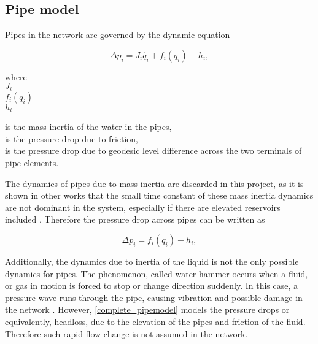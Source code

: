 \subsection{Pipe model}
\label{pipe_component}

Pipes in the network are governed by the dynamic equation

\begin{equation}
\label{complete_pipemodel}
  \Delta p_i = J_i \dot{q_i} + f_i(q_i) - h_i,
\end{equation}

 \begin{minipage}[t]{0.20\textwidth}
where\\
\hspace*{8mm} $J_i$ \\
\hspace*{8mm} $f_i(q_i)$ \\
\hspace*{8mm} $ h_i$ 
\end{minipage}
\begin{minipage}[t]{0.68\textwidth}
\vspace*{2mm}
is the mass inertia of the water in the pipes,\\ 
is the pressure drop due to friction,\\
is the pressure drop due to geodesic level difference across the two terminals of pipe elements.
\end{minipage}

The dynamics of pipes due to mass inertia are discarded in this project, as it is shown in other works that the small time constant of these mass inertia dynamics are not dominant in the system, especially if there are elevated reservoirs included \cite{8thsemester_project,kenneth_houe}. Therefore the pressure drop across pipes can be written as

\begin{equation}
\label{complete_pipemodel1}
  \Delta p_i = f_i(q_i) - h_i,
\end{equation}

Additionally, the dynamics due to inertia of the liquid is not the only possible dynamics for pipes. The phenomenon, called water hammer occurs when a fluid, or gas in motion is forced to stop or change direction suddenly. In this case, a pressure wave runs through the pipe, causing vibration and possible damage in the network \cite{2011water}. However, \eqref{complete_pipemodel} models the pressure drops or equivalently, headloss, due to the elevation of the pipes and friction of the fluid. Therefore such rapid flow change is not assumed in the network.

